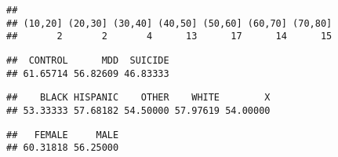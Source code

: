 \documentclass[]{article}
\newenvironment{Shaded}{\begin{snugshade}}{\end{snugshade}}
\newcommand{\CommentTok}[1]{\textcolor[rgb]{0.56,0.35,0.01}{\textit{#1}}}
\newcommand{\KeywordTok}[1]{\textcolor[rgb]{0.13,0.29,0.53}{\textbf{#1}}}
\newcommand{\NormalTok}[1]{#1}
\newcommand{\OperatorTok}[1]{\textcolor[rgb]{0.81,0.36,0.00}{\textbf{#1}}}
\begin{document}
\begin{verbatim}
## 
## (10,20] (20,30] (30,40] (40,50] (50,60] (60,70] (70,80] 
##       2       2       4      13      17      14      15
\end{verbatim}

\begin{Shaded}
\end{Shaded}

\begin{Shaded}
\end{Shaded}

\begin{verbatim}
##  CONTROL      MDD  SUICIDE 
## 61.65714 56.82609 46.83333
\end{verbatim}

\begin{Shaded}
\end{Shaded}

\begin{verbatim}
##    BLACK HISPANIC    OTHER    WHITE        X 
## 53.33333 57.68182 54.50000 57.97619 54.00000
\end{verbatim}

\begin{Shaded}
\end{Shaded}

\begin{verbatim}
##   FEMALE     MALE 
## 60.31818 56.25000
\end{verbatim}
\end{document}
